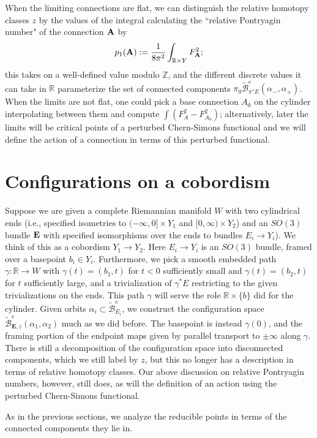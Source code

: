 \documentclass[10pt,a4paper]{amsart}
\newcommand{\pE}{\pi^* \! E}
\theoremstyle{definition}
\theoremstyle{remark}
\numberwithin{figure}{qchap}
\begin{document}
When the limiting connections are flat, we can distinguish the relative homotopy classes $z$ by the values of the integral calculating the ``relative Pontryagin number" of the connection $\bf{A}$ by $$p_1(\mathbf{A}) := \frac{1}{8\pi^2} \int_{\mathbb R \times Y} F_{\bf A}^2;$$ this takes on a well-defined value modulo $\mathbb Z$, and the different discrete values it can take in $\mathbb R$ parameterize the set of connected components $\pi_0\widetilde{\mathcal B}^e_{\pE}(\alpha_-, \alpha_+)$. When the limits are not flat, one could pick a base connection $A_0$ on the cylinder interpolating between them and compute $\int (F_A^2 - F_{A_0}^2)$; alternatively, later the limits will be critical points of a perturbed Chern-Simons functional and we will define the action of a connection in terms of this perturbed functional.

\section{Configurations on a cobordism}\label{sec:config-4d}
Suppose we are given a complete Riemannian manifold $W$ with two cylindrical ends (i.e., specified isometries to $(-\infty, 0] \times Y_1$ and $[0, \infty) \times Y_2$) and an $SO(3)$ bundle $\bf E$ with specified isomorphisms over the ends to bundles $E_i \to Y_i$). We think of this as a cobordism $Y_1 \to Y_2$. Here $E_i \to Y_i$ is an $SO(3)$ bundle, framed over a basepoint $b_i \in Y_i$. Furthermore, we pick a smooth embedded path $\gamma: \mathbb R \to W$ with $\gamma(t) = (b_1, t)$ for $t < 0$ sufficiently small and $\gamma(t) = (b_2, t)$ for $t$ sufficiently large, and a trivialization of $\gamma^*E$ restricting to the given trivializations on the ends. This path $\gamma$ will serve the role $\mathbb R \times \{b\}$ did for the cylinder. Given orbits $\alpha_i \subset \widetilde{\mathcal B}^e_{E_i}$, we construct the configuration space $\widetilde{\mathcal B}^e_{\mathbf{E}, z}(\alpha_1, \alpha_2)$ much as we did before. The basepoint is instead $\gamma(0)$, and the framing portion of the endpoint maps given by parallel transport to $\pm \infty$ along $\gamma$. There is still a decomposition of the configuration space into disconnected components, which we still label by $z$, but this no longer has a description in terms of relative homotopy classes. Our above discussion on relative Pontryagin numbers, however, still does, as will the definition of an action using the perturbed Chern-Simons functional.

As in the previous sections, we analyze the reducible points in terms of the connected components they lie in. 
\end{document}
